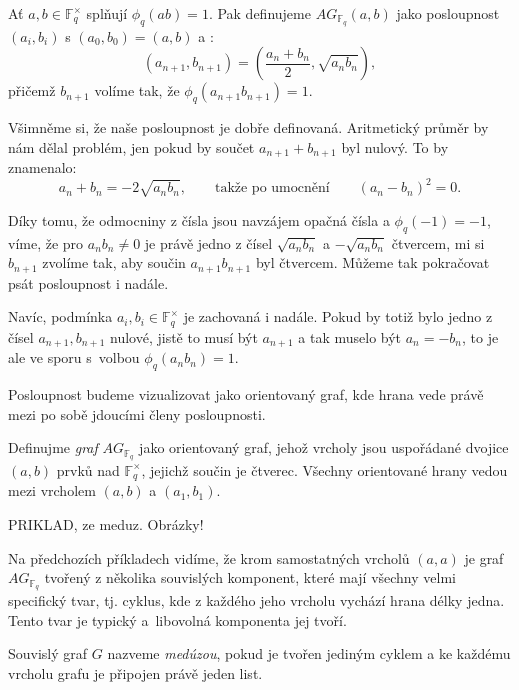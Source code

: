 \documentclass[12pt]{report}
\begin{document}
\begin{definice}
Ať $a,b \in \mathbb{F}_q ^{\times}$ splňují $\phi_q (ab) = 1$. Pak definujeme $AG_{\mathbb{F}_q}(a,b)$ jako posloupnost $(a_i,b_i)$ s $(a_0,b_0) = (a,b)$ a :
\begin{equation*}
\left(a_{n+1},b_{n+1} \right) = \left(\frac{a_n+b_n}{2}, \sqrt{a_n b_n} \right),
\end{equation*}
přičemž $b_{n+1}$ volíme tak, že $\phi_q (a_{n+1} b_{n+1}) = 1$.
\end{definice}
Všimněme si, že naše posloupnost je dobře definovaná. Aritmetický průměr by nám dělal problém, jen pokud by součet $a_{n+1} + b_{n+1}$ byl nulový. To by znamenalo:
$$a_{n}+b_{n} = - 2\sqrt{a_n b_n}, \qquad \text{takže po umocnění} \qquad (a_n - b_n)^2 = 0.$$

Díky tomu, že odmocniny z čísla jsou navzájem opačná čísla a $\phi_q(-1)=-1$, víme, že pro $a_n b_n \neq 0$ je právě jedno z čísel $\sqrt{a_n b_n}$ a $-\sqrt{a_n b_n}$ čtvercem, mi si $b_{n+1}$ zvolíme tak, aby součin $a_{n+1} b_{n+1}$ byl čtvercem. Můžeme tak pokračovat psát posloupnost i nadále.

Navíc, podmínka $a_i,b_i \in \mathbb{F}_q ^{\times}$ je zachovaná i nadále. Pokud by totiž bylo jedno z čísel $a_{n+1},b_{n+1}$ nulové, jistě to musí být $a_{n+1}$ a tak muselo být $a_{n} = - b_n$, to je ale ve sporu s~volbou $\phi_q (a_n b_n) = 1$. 

Posloupnost budeme vizualizovat jako orientovaný graf, kde hrana vede právě mezi po sobě jdoucími členy posloupnosti.
\begin{definice}
Definujme \textit{graf} $AG_{\mathbb{F}_q}$ jako orientovaný graf, jehož vrcholy jsou uspořádané dvojice $(a,b)$ prvků nad $\mathbb{F}_q ^{\times}$, jejichž součin je čtverec. Všechny orientované hrany vedou mezi vrcholem $(a,b)$ a $(a_1,b_1)$.
\end{definice}

PRIKLAD, ze meduz. Obrázky!

Na předchozích příkladech vidíme, že krom samostatných vrcholů $(a,a)$ je graf $AG_{\mathbb{F}_q}$ tvořený z několika souvislých komponent, které mají všechny velmi specifický tvar, tj. cyklus, kde z každého jeho vrcholu vychází hrana délky jedna. Tento tvar je typický a~libovolná komponenta jej tvoří.

\begin{definice}
Souvislý graf $G$ nazveme \textit{medúzou}, pokud je tvořen jediným cyklem a ke každému vrcholu grafu je připojen právě jeden list.
\end{definice}
\end{document}
